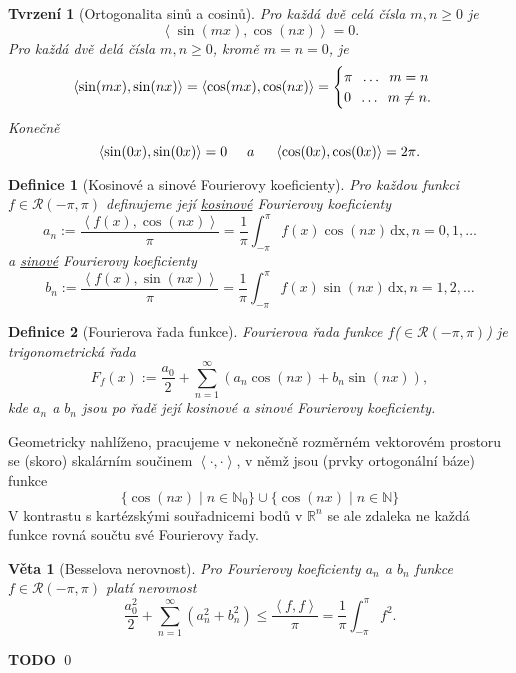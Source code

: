 \documentclass[11pt]{article}
\theoremstyle{nontheoremstyle}
\newtheorem*{definition}{Definice}
\renewenvironment{proof}{{\noindent\bfseries Důkaz:}}{\qed}
\theoremstyle{nontheoremstylenodot}
\theoremstyle{theoremstyle}
\newtheorem*{theorem}{Věta}
\newtheorem*{lemma}{Tvrzení}
\begin{document}
\begin{lemma}[Ortogonalita sinů a cosinů]
    Pro každá dvě celá čísla $m,n\geq 0$ je \[ \left< \sin(mx),\cos(nx) \right> = 0. \]
    Pro každá dvě delá čísla $m,n\geq 0$, kromě $m=n=0$, je
    \[ \left< \sin(mx), \sin(nx) \right> = \left< \cos(mx), \cos(nx) \right> =
    \begin{cases} \pi \hspace{2mm} \dots \hspace{2mm} m=n\\ 0 \hspace{2mm} \dots \hspace{2mm} m\neq n. \end{cases} \]
    Konečně
    \[ \left< \sin(0x), \sin(0x) \right> = 0 \hspace{5mm} a \hspace{5mm} \left< \cos(0x), \cos(0x) \right> = 2\pi. \]
\end{lemma}

\begin{definition}[Kosinové a sinové Fourierovy koeficienty]
    Pro každou funkci $f \in \mathcal{R}(-\pi,\pi)$ definujeme její
    \underline{kosinové} Fourierovy koeficienty
    \[ a_n := \frac{\left< f(x), \cos(nx) \right>}{\pi} = \frac{1}{\pi}\int_{-\pi}^{\pi}f(x)\cos(nx)\,\text{dx}, n = 0,1,\dots \]
    a \underline{sinové} Fourierovy koeficienty
    \[ b_n := \frac{\left< f(x), \sin(nx) \right>}{\pi} = \frac{1}{\pi}\int_{-\pi}^{\pi}f(x)\sin(nx)\,\text{dx}, n = 1,2,\dots \]
\end{definition}

\begin{definition}[Fourierova řada funkce]
    Fourierova řada funkce $f$($\in \mathcal{R}(-\pi,\pi)$) je trigonometrická řada
    \[ F_f(x) := \frac{a_0}{2} + \sum_{n=1}^{\infty} \left( a_n \cos(nx) + b_n \sin(nx) \right), \]
    kde $a_n$ a $b_n$ jsou po řadě její kosinové a sinové Fourierovy koeficienty.
\end{definition}

\noindent
Geometricky nahlíženo, pracujeme v nekonečně rozměrném vektorovém prostoru se (skoro) skalárním součinem $\left<\cdot,\cdot\right>$,
v němž jsou (prvky ortogonální báze) funkce
\[ \{ \cos(nx) \mid n\in \mathbb{N}_0 \} \cup \{ \cos(nx) \mid n\in \mathbb{N} \} \]
V kontrastu s kartézskými souřadnicemi bodů v $\mathbb{R}^n$ se ale zdaleka ne každá funkce rovná součtu
své Fourierovy řady.

\begin{theorem}[Besselova nerovnost]
    Pro Fourierovy koeficienty $a_n$ a $b_n$ funkce $f \in \mathcal{R}(-\pi,\pi)$ platí nerovnost
    \[ \frac{a_0^2}{2} + \sum_{n=1}^{\infty}(a_n^2+b_n^2) \leq \frac{\left<f,f\right>}{\pi} = \frac{1}{\pi}\int_{-\pi}^{\pi}f^2. \]
\end{theorem}
\begin{proof}
    \LARGE
    \textbf{TODO}
\end{proof}
\end{document}
